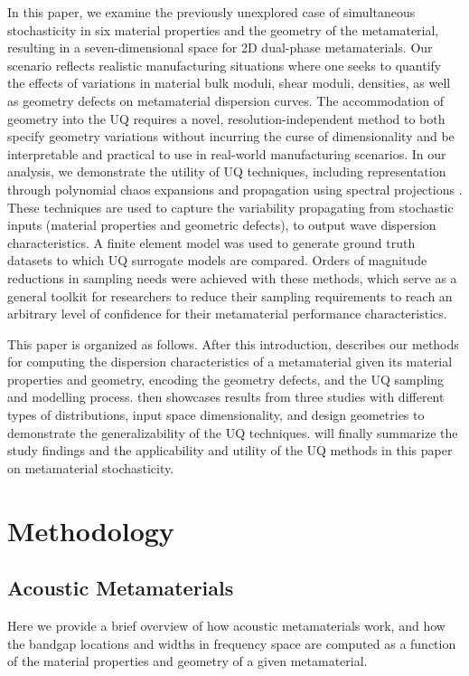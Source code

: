 \documentclass[preprint,review,12pt]{elsarticle}
\begin{document}
In this paper, we examine the previously unexplored case of simultaneous stochasticity in six material properties and the geometry of the metamaterial, resulting in a seven-dimensional space for 2D dual-phase metamaterials. Our scenario reflects realistic manufacturing situations where one seeks to quantify the effects of variations in material bulk moduli, shear moduli, densities, as well as geometry defects on metamaterial dispersion curves. The accommodation of geometry into the UQ requires a novel, resolution-independent method to both specify geometry variations without incurring the curse of dimensionality and be interpretable and practical to use in real-world manufacturing scenarios. In our analysis, we demonstrate the utility of UQ techniques, including representation through polynomial chaos expansions and propagation using spectral projections \cite{hariri2020polynomial, sheen2011method, najm2009uncertainty, metivier2020efficient}. These techniques are used to capture the variability propagating from stochastic inputs (material properties and geometric defects), to output wave dispersion characteristics. A finite element model was used to generate ground truth datasets to which UQ surrogate models are compared. Orders of magnitude reductions in sampling needs were achieved with these methods, which serve as a general toolkit for researchers to reduce their sampling requirements to reach an arbitrary level of confidence for their metamaterial performance characteristics.

This paper is organized as follows. After this introduction,  describes our methods for computing the dispersion characteristics of a metamaterial given its material properties and geometry, encoding the geometry defects, and the UQ sampling and modelling process.  then showcases results from three studies with different types of distributions, input space dimensionality, and design geometries to demonstrate the generalizability of the UQ techniques.  will finally summarize the study findings and the applicability and utility of the UQ methods in this paper on metamaterial stochasticity.

\section{Methodology}
\label{sec:Methodology}
\subsection{Acoustic Metamaterials}
Here we provide a brief overview of how acoustic metamaterials work, and how the bandgap locations and widths in frequency space are computed as a function of the material properties and geometry of a given metamaterial. 
\end{document}

